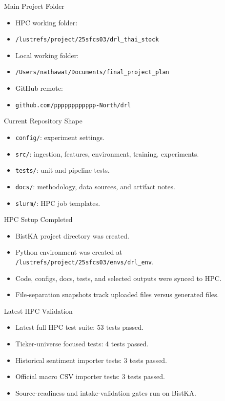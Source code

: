 \documentclass[aspectratio=43,10pt]{beamer}
\begin{document}
\begin{frame}{Main Project Folder}
\begin{itemize}
  \item HPC working folder:
  \item \texttt{/lustrefs/project/25sfcs03/drl\_thai\_stock}
  \item Local working folder:
  \item \texttt{/Users/nathawat/Documents/final\_project\_plan}
  \item GitHub remote:
  \item \texttt{github.com/pppppppppppp-North/drl}
\end{itemize}
\end{frame}

\begin{frame}{Current Repository Shape}
\begin{itemize}
  \item \texttt{config/}: experiment settings.
  \item \texttt{src/}: ingestion, features, environment, training, experiments.
  \item \texttt{tests/}: unit and pipeline tests.
  \item \texttt{docs/}: methodology, data sources, and artifact notes.
  \item \texttt{slurm/}: HPC job templates.
\end{itemize}
\end{frame}

\begin{frame}{HPC Setup Completed}
\begin{itemize}
  \item BistKA project directory was created.
  \item Python environment was created at \texttt{/lustrefs/project/25sfcs03/envs/drl\_env}.
  \item Code, configs, docs, tests, and selected outputs were synced to HPC.
  \item File-separation snapshots track uploaded files versus generated files.
\end{itemize}
\end{frame}

\begin{frame}{Latest HPC Validation}
\begin{itemize}
  \item Latest full HPC test suite: 53 tests passed.
  \item Ticker-universe focused tests: 4 tests passed.
  \item Historical sentiment importer tests: 3 tests passed.
  \item Official macro CSV importer tests: 3 tests passed.
  \item Source-readiness and intake-validation gates run on BistKA.
\end{itemize}
\end{frame}
\end{document}
